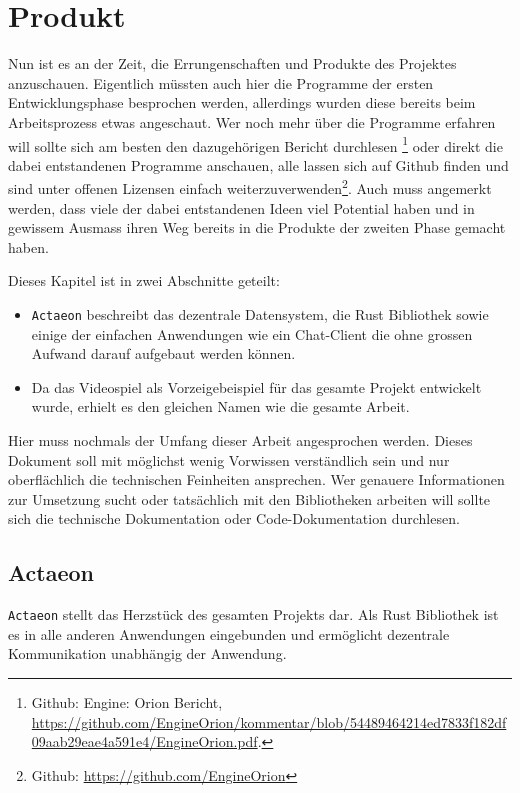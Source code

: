 \documentclass[11pt]{article}
\begin{document}
\section{Produkt}
\label{sec:org5b2d33c}
Nun ist es an der Zeit, die Errungenschaften und Produkte des
Projektes anzuschauen. Eigentlich müssten auch hier die Programme der
ersten Entwicklungsphase besprochen werden, allerdings wurden diese
bereits beim Arbeitsprozess etwas angeschaut. Wer noch mehr über die
Programme erfahren will sollte sich am besten den dazugehörigen
Bericht durchlesen \footnote{Github: Engine: Orion Bericht,
\url{https://github.com/EngineOrion/kommentar/blob/54489464214ed7833f182df09aab29eae4a591e4/EngineOrion.pdf}.} oder direkt die dabei entstandenen
Programme anschauen, alle lassen sich auf Github finden und sind unter
offenen Lizensen einfach weiterzuverwenden\footnote{Github: \url{https://github.com/EngineOrion}}. Auch muss angemerkt werden, dass viele der dabei
entstandenen Ideen viel Potential haben und in gewissem Ausmass ihren
Weg bereits in die Produkte der zweiten Phase gemacht haben.

\noindent Dieses Kapitel ist in zwei Abschnitte geteilt:
\begin{itemize}
\item \texttt{Actaeon} beschreibt das dezentrale Datensystem, die Rust Bibliothek
sowie einige der einfachen Anwendungen wie ein Chat-Client die ohne
grossen Aufwand darauf aufgebaut werden können.
\item Da das Videospiel als Vorzeigebeispiel für das gesamte Projekt
entwickelt wurde, erhielt es den gleichen Namen wie die gesamte
Arbeit.
\end{itemize}

\noindent Hier muss nochmals der Umfang dieser Arbeit angesprochen
werden. Dieses Dokument soll mit möglichst wenig Vorwissen
verständlich sein und nur oberflächlich die technischen Feinheiten
ansprechen. Wer genauere Informationen zur Umsetzung sucht oder
tatsächlich mit den Bibliotheken arbeiten will sollte sich die
technische Dokumentation oder Code-Dokumentation durchlesen.
\subsection{Actaeon}
\label{sec:org5d4013c}
\texttt{Actaeon} stellt das Herzstück des gesamten Projekts dar. Als Rust
Bibliothek ist es in alle anderen Anwendungen eingebunden und
ermöglicht dezentrale Kommunikation unabhängig der Anwendung.\\
\end{document}
